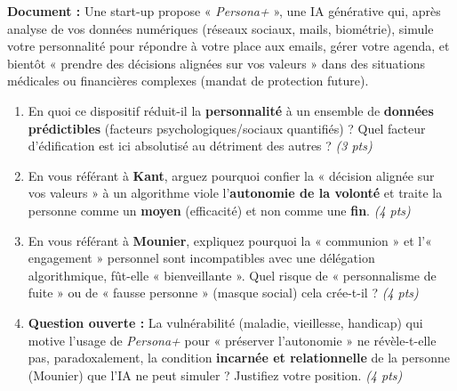 \documentclass[11pt]{article}
\begin{document}
\begin{exercice}
\textbf{Document :} Une start-up propose « \textit{Persona+ }», une IA générative qui, après analyse de vos données numériques (réseaux sociaux, mails, biométrie), simule votre personnalité pour répondre à votre place aux emails, gérer votre agenda, et bientôt « prendre des décisions alignées sur vos valeurs » dans des situations médicales ou financières complexes (mandat de protection future).
\begin{enumerate}
    \item En quoi ce dispositif réduit-il la \textbf{personnalité} à un ensemble de \textbf{données prédictibles} (facteurs psychologiques/sociaux quantifiés) ? Quel facteur d'édification est ici absolutisé au détriment des autres ? \textit{(3 pts)}
    \item En vous référant à \textbf{Kant}, arguez pourquoi confier la « décision alignée sur vos valeurs » à un algorithme viole l'\textbf{autonomie de la volonté} et traite la personne comme un \textbf{moyen} (efficacité) et non comme une \textbf{fin}. \textit{(4 pts)}
    \item En vous référant à \textbf{Mounier}, expliquez pourquoi la « communion » et l'« engagement » personnel sont incompatibles avec une délégation algorithmique, fût-elle « bienveillante ». Quel risque de « personnalisme de fuite » ou de « fausse personne » (masque social) cela crée-t-il ? \textit{(4 pts)}
    \item \textbf{Question ouverte :} La vulnérabilité (maladie, vieillesse, handicap) qui motive l'usage de \textit{Persona+} pour « préserver l'autonomie » ne révèle-t-elle pas, paradoxalement, la condition \textbf{incarnée et relationnelle} de la personne (Mounier) que l'IA ne peut simuler ? Justifiez votre position. \textit{(4 pts)}
\end{enumerate}
\end{exercice}
\end{document}
